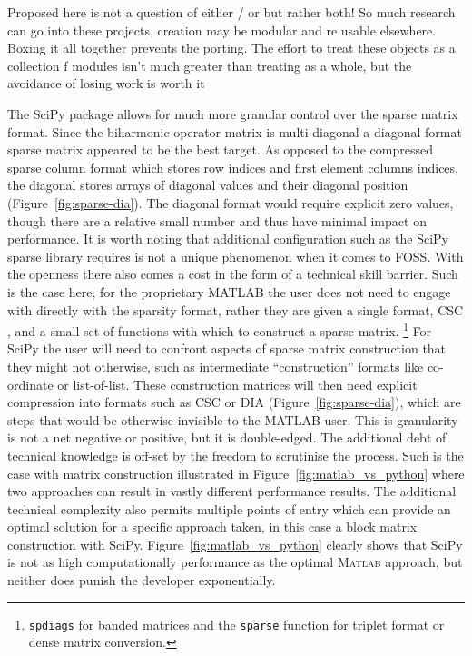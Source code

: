 Proposed here is not a question of either / or but rather both! So much research can go into these projects, creation may be modular and re usable elsewhere. Boxing it all together prevents the porting. The effort to treat these objects as a collection f modules isn’t much greater than treating as a whole, but the avoidance of losing work is worth it




The SciPy package allows for much more granular control over the sparse matrix format. Since the biharmonic operator matrix is multi-diagonal a diagonal format sparse matrix appeared to be the best target. As opposed to the compressed sparse column format which stores row indices and first element columns indices, the diagonal stores arrays of diagonal values and their diagonal position (Figure~\ref{fig:sparse-dia}). The diagonal format would require explicit zero values, though there are a relative small number and thus have minimal impact on performance. 
It is worth noting that additional configuration such as the SciPy sparse library requires is not a unique phenomenon when it comes to FOSS. With the openness there also comes a cost in the form of a technical skill barrier.
Such is the case here, for the proprietary MATLAB the user does not need to engage with directly with the sparsity format, rather they are given a single format, CSC \cite{gilbert_sparse_1992}, and a small set of functions with which to construct a sparse matrix.
\footnote{\texttt{spdiags} for banded matrices and the \texttt{sparse} function for triplet format or dense matrix conversion.}
For SciPy the user will need to confront aspects of sparse matrix construction that they might not otherwise, such as intermediate ``construction'' \cite{eding_sparse_2019} formats like co-ordinate or list-of-list. These construction matrices will then need explicit compression into formats such as CSC or DIA (Figure~\ref{fig:sparse-dia}), which are steps that would be otherwise invisible to the MATLAB user. This is granularity is not a net negative or positive, but  it is double-edged. The additional debt of technical knowledge is off-set by the freedom to scrutinise the process. Such is the case with matrix construction illustrated in Figure~\ref{fig:matlab_vs_python} where two approaches can result in vastly different performance results. The additional technical complexity also permits multiple points of entry which can provide an optimal solution for a specific approach taken, in this case a block matrix construction with SciPy. Figure~\ref{fig:matlab_vs_python}
clearly shows that SciPy is not as high computationally performance as the optimal M\textsc{atlab} approach, but neither does punish the developer exponentially.

